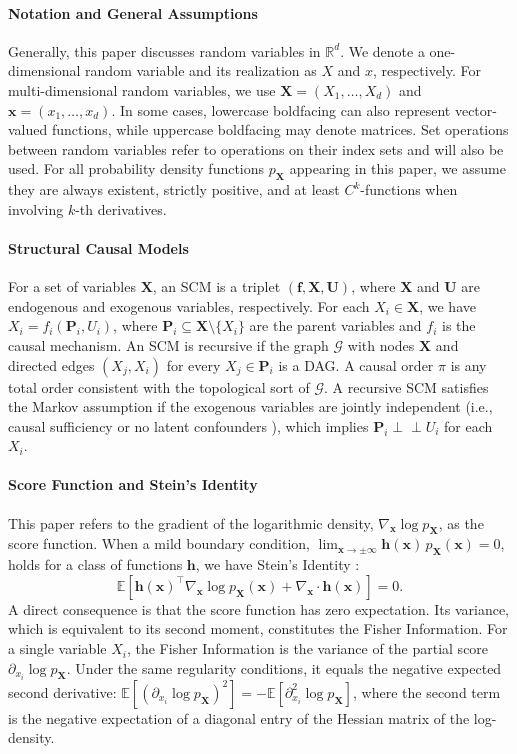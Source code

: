 \documentclass{article}
\theoremstyle{plain}
\theoremstyle{definition}
\theoremstyle{remark}
\newcommand{\indep}{\perp\!\!\!\perp}
\begin{document}
\paragraph{Notation and General Assumptions}
Generally, this paper discusses random variables in $\mathbb{R}^d$. We denote a one-dimensional random variable and its realization as $X$ and $x$, respectively. For multi-dimensional random variables, we use $\bm{X}=(X_1,\dots,X_d)$ and $\bm{x}=(x_1,\dots,x_d)$. In some cases, lowercase boldfacing can also represent vector-valued functions, while uppercase boldfacing may denote matrices. Set operations between random variables refer to operations on their index sets and will also be used. For all probability density functions $p_{\bm{X}}$ appearing in this paper, we assume they are always existent, strictly positive, and at least $C^k$-functions when involving $k$-th derivatives.

\paragraph{Structural Causal Models}
For a set of variables $\bm{X}$, an SCM is a triplet $(\bm{f},\bm{X},\bm{U})$, where $\bm{X}$ and $\bm{U}$ are endogenous and exogenous variables, respectively. For each $X_i\in\bm{X}$, we have $X_i=f_i(\bm{P}_i,U_i)$, where $\bm{P}_i\subseteq\bm{X}\!\setminus\!\{X_i\}$ are the parent variables and $f_i$ is the causal mechanism. An SCM is recursive if the graph $\mathcal{G}$ with nodes $\bm{X}$ and directed edges $(X_j,X_i)$ for every $X_j\in\bm{P}_i$ is a DAG. A causal order $\pi$ is any total order consistent with the topological sort of $\mathcal{G}$. A recursive SCM satisfies the Markov assumption if the exogenous variables are jointly independent (i.e., causal sufficiency or no latent confounders \citep{Pearl2009}), which implies $\bm{P}_i\indep U_i$ for each $X_i$.

\paragraph{Score Function and Stein's Identity}
This paper refers to the gradient of the logarithmic density, $\nabla_{\bm{x}}\log p_{\bm{X}}$, as the score function. When a mild boundary condition, $\lim_{\bm{x}\to\pm\infty}\bm{h}(\bm{x})\,p_{\bm{X}}(\bm{x})=0$, holds for a class of functions $\bm{h}$, we have Stein's Identity \citep{Stein1972}:
\[\mathbb{E}\left[\bm{h}(\bm{x})^\intercal\nabla_{\bm{x}}\log p_{\bm{X}}(\bm{x})+\nabla_{\bm{x}}\cdot\bm{h}(\bm{x})\right]=0.\]
A direct consequence is that the score function has zero expectation. Its variance, which is equivalent to its second moment, constitutes the Fisher Information. For a single variable $X_i$, the Fisher Information is the variance of the partial score $\partial_{x_i}\log p_{\bm{X}}$. Under the same regularity conditions, it equals the negative expected second derivative: $\mathbb{E}[(\partial_{x_i}\log p_{\bm{X}})^2]=-\mathbb{E}\left[\partial_{x_i}^2\log p_{\bm{X}}\right]$, where the second term is the negative expectation of a diagonal entry of the Hessian matrix of the log-density.
\end{document}
